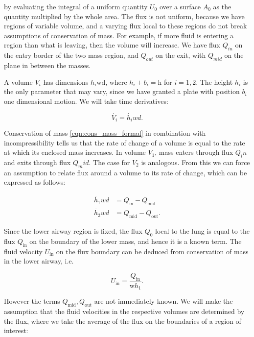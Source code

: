 \documentclass{article}
\begin{document}
by evaluating the integral of a uniform quantity $U_0$ over a surface $A_0$ as the quantity multiplied by the whole area.
The flux is not uniform, because we have regions of variable volume, and a varying flux local to these regions do not break assumptions of conservation of mass.
For example, if more fluid is entering a region than what is leaving, then the volume will increase.
We have flux $Q_{in}$ on the entry border of the two mass region, and $Q_{out}$ on the exit,
with $Q_{mid}$ on the plane in between the masses.

A volume $V_i$ has dimensions $h_i \mathrm{wd}$, where $h_i + b_i = \mathrm{h}$ for $i=1,2$.
The height $h_i$ is the only parameter that may vary, since we have granted a plate with position $b_i$ one dimensional motion.
We will take time derivatives:

\begin{equation}
    \dot{V_i} = \dot{h_i} w d.
\end{equation}

Conservation of mass \ref{eqn:cons_mass_formal} in combination with incompressibility tells us that the rate of change of a volume is equal to the rate at which its enclosed mass increases.
In volume $V_1$, mass enters through flux $Q_in$ and exits through flux $Q_mid$. The case for $V_2$ is analogous.
From this we can force an assumption to relate flux around a volume to its rate of change, which can be expressed as follows:

\begin{equation}
    \begin{aligned}
        \dot{h_1} w d &= Q_\mathrm{in} - Q_\mathrm{mid} \\
        \dot{h_2} w d &= Q_\mathrm{mid} - Q_\mathrm{out}.
    \end{aligned}
    \label{eqn:twomass_flux_motion}
\end{equation}

Since the lower airway region is fixed,
the flux $Q_0$ local to the lung is equal to the flux $Q_\mathrm{in}$ on the boundary of the lower mass,
and hence it is a known term. The fluid velocity $U_\mathrm{in}$ on the flux boundary can be deduced from conservation of mass in the lower airway, i.e.

\begin{equation}
    U_\mathrm{in} = \frac{Q_\mathrm{in}}{\mathrm{w}h_1}.
    \label{eqn:twomass_flux_in}
\end{equation}

However the terms $Q_\mathrm{mid}, Q_\mathrm{out}$ are not immediately known.
We will make the assumption that the fluid velocities in the respective volumes are determined by the flux,
where we take the average of the flux on the boundaries of a region of interest:
\end{document}
